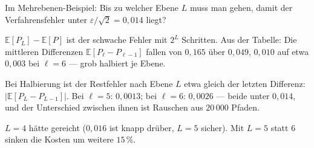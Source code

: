 \begin{aufgabe}
Im Mehrebenen-Beispiel: Bis zu welcher Ebene $L$ muss man gehen, damit der Verfahrensfehler unter $\varepsilon/\sqrt2 = 0{,}014$ liegt?

\loesung
{}
$\mathbb E[P_L] - \mathbb E[P]$ ist der schwache Fehler mit $2^L$ Schritten. Aus der Tabelle: Die mittleren Differenzen $\mathbb E[P_\ell - P_{\ell-1}]$ fallen von $0{,}165$ über $0{,}049$, $0{,}010$ auf etwa $0{,}003$ bei $\ell = 6$ --- grob halbiert je Ebene.

Bei Halbierung ist der Restfehler nach Ebene $L$ etwa gleich der letzten Differenz: $|\mathbb E[P_L - P_{L-1}]|$. Bei $\ell=5$: $0{,}0013$; bei $\ell = 6$: $0{,}0026$ --- beide unter $0{,}014$, und der Unterschied zwischen ihnen ist Rauschen aus $20\,000$ Pfaden.

$L = 4$ hätte gereicht ($0{,}016$ ist knapp drüber, $L=5$ sicher). Mit $L=5$ statt $6$ sinken die Kosten um weitere $15\,\%$.

\begin{center}
\begin{minipage}{0.88\textwidth}
\end{minipage}
\end{center}
\end{aufgabe}

